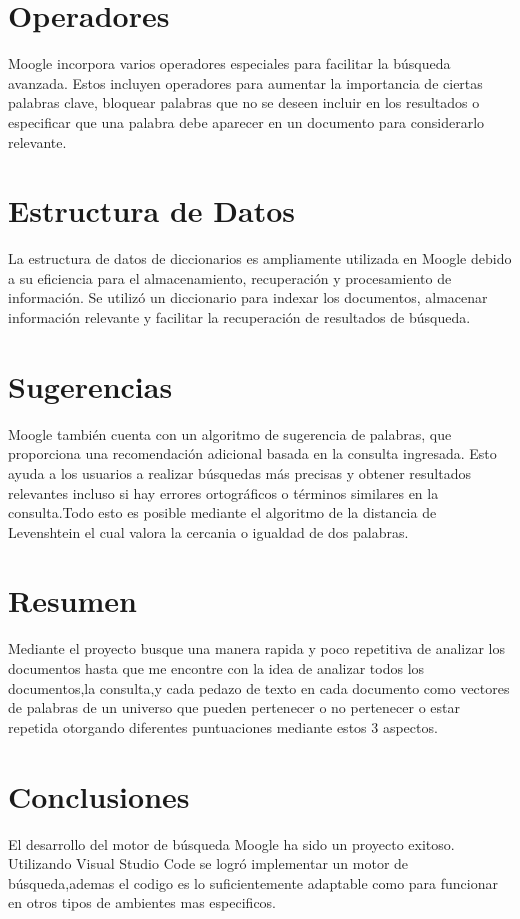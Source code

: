 \documentclass{article}
\begin{document}
\section*{Operadores}
Moogle incorpora varios operadores especiales para facilitar la búsqueda avanzada. Estos incluyen operadores para aumentar la importancia de ciertas palabras clave, bloquear palabras que no se deseen incluir en los resultados o especificar que una palabra debe aparecer en un documento para considerarlo relevante.

\section*{Estructura de Datos}
La estructura de datos de diccionarios es ampliamente utilizada en Moogle debido a su eficiencia para el almacenamiento, recuperación y procesamiento de información. Se utilizó un diccionario para indexar los documentos, almacenar información relevante y facilitar la recuperación de resultados de búsqueda.

\section*{Sugerencias}
Moogle también cuenta con un algoritmo de sugerencia de palabras, que proporciona una recomendación adicional basada en la consulta ingresada. Esto ayuda a los usuarios a realizar búsquedas más precisas y obtener resultados relevantes incluso si hay errores ortográficos o términos similares en la consulta.Todo esto es posible mediante el algoritmo de la distancia de Levenshtein el cual valora la cercania o igualdad de dos palabras.

\newpage
\section*{Resumen}
Mediante el proyecto busque una manera rapida y poco repetitiva de analizar los documentos hasta que me encontre con la idea de analizar todos los documentos,la consulta,y cada pedazo de texto en cada documento como vectores de palabras de un universo que pueden pertenecer o no pertenecer o estar repetida otorgando diferentes puntuaciones mediante estos 3 aspectos.


\section*{Conclusiones}
El desarrollo del motor de búsqueda Moogle ha sido un proyecto exitoso. Utilizando Visual Studio Code se logró implementar un motor de búsqueda,ademas el codigo es lo suficientemente adaptable como para funcionar en otros tipos de ambientes mas especificos.
\end{document}
